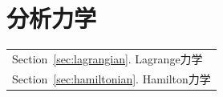 \part{分析力学}\label{Part:Analytical}
\begin{margintable}\vspace{1.4in}\footnotesize
	\begin{tabularx}{\marginparwidth}{|X}
		Section~\ref{sec:lagrangian}. Lagrange力学\\
		Section~\ref{sec:hamiltonian}. Hamilton力学\\
	\end{tabularx}
\end{margintable}


\newpage
